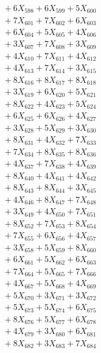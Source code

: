 \documentclass[a4paper,10pt]{article}
\begin{document}
{\begin{align}
&\;  + 6 X_{598} + 6 X_{599} + 5 X_{600} \\[0.3ex]
&\;  + 7 X_{601} + 7 X_{602} + 6 X_{603} \\[0.3ex]
&\;  + 6 X_{604} + 5 X_{605} + 4 X_{606} \\[0.3ex]
&\;  + 3 X_{607} + 7 X_{608} + 3 X_{609} \\[0.5ex]\allowbreak
&\;  + 4 X_{610} + 7 X_{611} + 4 X_{612} \\[0.3ex]
&\;  + 4 X_{613} + 7 X_{614} + 3 X_{615} \\[0.3ex]
&\;  + 8 X_{616} + 8 X_{617} + 8 X_{618} \\[0.3ex]
&\;  + 3 X_{619} + 6 X_{620} + 5 X_{621} \\[0.3ex]
&\;  + 8 X_{622} + 4 X_{623} + 5 X_{624} \\[0.3ex]
&\;  + 6 X_{625} + 6 X_{626} + 4 X_{627} \\[0.3ex]
&\;  + 3 X_{628} + 5 X_{629} + 3 X_{630} \\[0.3ex]
&\;  + 8 X_{631} + 4 X_{632} + 7 X_{633} \\[0.3ex]
&\;  + 7 X_{634} + 8 X_{635} + 8 X_{636} \\[0.3ex]
&\;  + 4 X_{637} + 7 X_{638} + 4 X_{639} \\[0.5ex]\allowbreak
&\;  + 8 X_{640} + 4 X_{641} + 4 X_{642} \\[0.3ex]
&\;  + 8 X_{643} + 8 X_{644} + 3 X_{645} \\[0.3ex]
&\;  + 4 X_{646} + 8 X_{647} + 7 X_{648} \\[0.3ex]
&\;  + 3 X_{649} + 4 X_{650} + 7 X_{651} \\[0.3ex]
&\;  + 8 X_{652} + 7 X_{653} + 8 X_{654} \\[0.3ex]
&\;  + 7 X_{655} + 6 X_{656} + 4 X_{657} \\[0.3ex]
&\;  + 3 X_{658} + 5 X_{659} + 8 X_{660} \\[0.3ex]
&\;  + 6 X_{661} + 5 X_{662} + 6 X_{663} \\[0.3ex]
&\;  + 7 X_{664} + 5 X_{665} + 7 X_{666} \\[0.3ex]
&\;  + 4 X_{667} + 5 X_{668} + 4 X_{669} \\[0.5ex]\allowbreak
&\;  + 5 X_{670} + 3 X_{671} + 3 X_{672} \\[0.3ex]
&\;  + 5 X_{673} + 5 X_{674} + 6 X_{675} \\[0.3ex]
&\;  + 8 X_{676} + 5 X_{677} + 6 X_{678} \\[0.3ex]
&\;  + 4 X_{679} + 3 X_{680} + 6 X_{681} \\[0.3ex]
&\;  + 8 X_{682} + 3 X_{683} + 7 X_{684} \\[0.3ex]

\end{align}}
\end{document}
